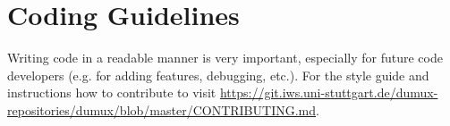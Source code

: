 \section{Coding Guidelines}
\label{sc_guidelines}
Writing code in a readable manner is very important, especially
for future code developers (e.g. for adding features, debugging, etc.).
For the style guide and instructions how to contribute to \Dumux visit
\url{https://git.iws.uni-stuttgart.de/dumux-repositories/dumux/blob/master/CONTRIBUTING.md}.
